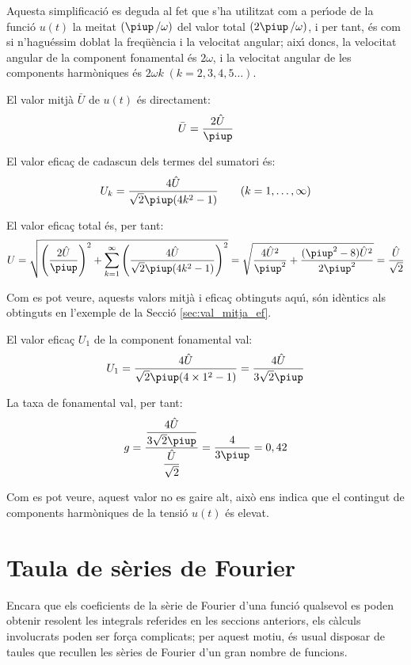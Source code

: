\begin{exemple}
Aquesta simplificaci\'{o} es deguda al fet que s'ha utilitzat com a
per\'{\i}ode de la funci\'{o} $u(t)$ la meitat $(\piup\,/\omega)$ del valor total
$(2\piup\,/\omega)$, i per tant, \'{e}s com si n'hagu\'{e}ssim doblat la
freq\"{u}\`{e}ncia i la velocitat angular; aix\'{\i} doncs, la velocitat angular
de la component fonamental \'{e}s $2\omega$, i la velocitat angular de
les components harm\`{o}niques \'{e}s $2\omega k \;(k=2,3,4,5\ldots)$.

El valor mitj\`{a} $\bar{U}$ de $u(t)$ \'{e}s directament:
\[
    \bar{U} = \frac{2\hat{U}}{\piup}
\]

El valor efica\c{c} de cadascun dels termes del sumatori \'{e}s:
\[
    U_k =\frac{4\hat{U}}{\sqrt{2}\piup(4k^2-1)}
    \qquad(k=1,\ldots,\infty)
\]

El valor efica\c{c} total \'{e}s, per tant:
\[
    U=\sqrt{\left(\frac{2\hat{U}}{\piup}\right)^2 + \sum_{k=1}^\infty
    \left(\frac{4\hat{U}}{\sqrt{2}\piup(4k^2-1)}\right)^2} =
    \sqrt{\frac{4\hat{U}^2}{\piup^2} + \frac{(\piup^2-8)\hat{U}^2}{2\piup^2}
    }= \frac{\hat{U}}{\sqrt{2}}
\]

Com es pot veure, aquests valors mitj\`{a} i efica\c{c} obtinguts aqu\'{\i}, s\'{o}n
id\`{e}ntics als obtinguts en l'exemple de la Secci\'{o}
\ref{sec:val_mitja_ef}.

El valor efica\c{c} $U_1$ de la component fonamental val:
\[
    U_1 =\frac{4\hat{U}}{\sqrt{2}\piup(4\times 1^2-1)} =
    \frac{4\hat{U}}{3\sqrt{2}\piup}
\]

La taxa de fonamental val, per tant:
\[
    g =
    \frac{\dfrac{4\hat{U}}{3\sqrt{2}\piup}}{\dfrac{\hat{U}}{\sqrt{2}}}
    =\frac{4}{3\piup} = 0,{42}
\]

Com es pot veure, aquest valor no es gaire alt, aix\`{o} ens indica que
el contingut de components harm\`{o}niques de la tensi\'{o} $u(t)$ \'{e}s
elevat.

\end{exemple}


\section{Taula de s\`{e}ries de Fourier}

Encara que els coeficients de la s\`{e}rie de Fourier d'una funci\'{o} qualsevol es poden
obtenir resolent les integrals referides en les seccions anteriors, els c\`{a}lculs
involucrats poden ser for\c{c}a complicats; per aquest motiu, \'{e}s usual
disposar de taules que recullen les s\`{e}ries de Fourier d'un
gran nombre de funcions.


